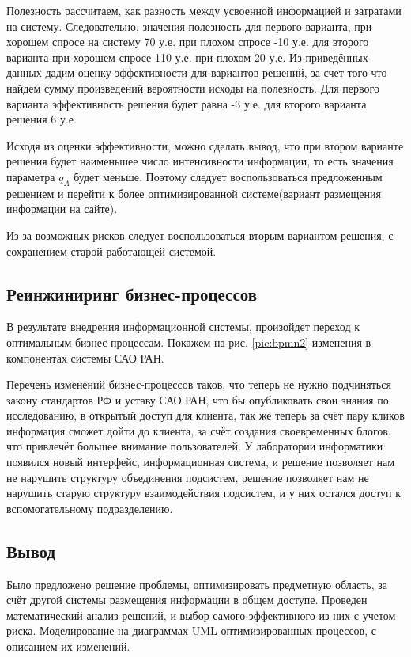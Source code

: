 Полезность рассчитаем, как разность между усвоенной информацией и затратами на систему. Следовательно, значения полезность для первого варианта, при хорошем спросе на систему 70 у.е. при плохом спросе -10 у.е. для второго варианта при хорошем спросе 110 у.е. при плохом 20 у.е.
Из приведённых данных дадим оценку эффективности для вариантов решений, за счет того что найдем сумму произведений вероятности исходы на полезность. Для первого варианта эффективность решения будет равна -3 у.е. для второго варианта решения 6 у.е.

Исходя из оценки эффективности, можно сделать вывод, что при втором варианте решения будет наименьшее число интенсивности информации, то есть значения параметра $q_A$ будет меньше. Поэтому следует воспользоваться предложенным решением и перейти к более оптимизированной системе(вариант размещения информации на сайте). 

Из-за возможных рисков следует воспользоваться вторым вариантом решения, с сохранением старой работающей системой.

\pagebreak

\subsection{Реинжиниринг бизнес-процессов}

В результате внедрения информационной системы, произойдет переход к оптимальным бизнес-процессам. Покажем на рис. \ref{pic:bpmn2} изменения в компонентах системы САО РАН.

Перечень изменений бизнес-процессов таков, что теперь не нужно подчиняться закону стандартов РФ и уставу САО РАН, что бы опубликовать свои знания по исследованию, в открытый доступ для клиента, так же теперь за счёт пару кликов информация сможет дойти до клиента, за счёт создания своевременных блогов, что привлечёт большее внимание пользователей.
У лаборатории информатики появился новый интерфейс, информационная система, и решение позволяет нам не нарушить структуру объединения подсистем, решение позволяет нам не нарушить старую структуру взаимодействия подсистем, и у них остался доступ к вспомогательному подразделению.


\subsection{Вывод}
Было предложено решение проблемы, оптимизировать предметную область, за счёт другой системы размещения информации в общем доступе. Проведен математический анализ решений, и выбор самого эффективного из них с учетом риска. Моделирование на диаграммах UML оптимизированных процессов, с описанием их изменений. 
\pagebreak